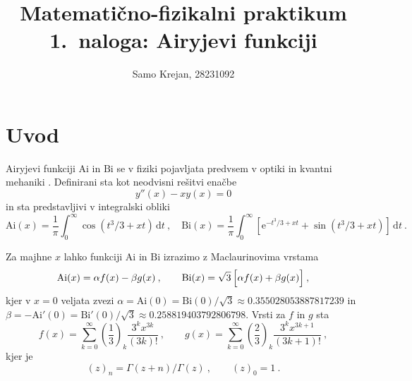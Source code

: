 \documentclass[slovene,11pt,a4paper]{article}
\title{
\sc\large Matematično-fizikalni praktikum \thisyear\\
\bigskip
\bf\Large 1.~naloga: Airyjevi funkciji
}
\author{Samo Krejan, 28231092}
\date{}
\newcommand{\dd}{\,\mathrm{d}}
\newcommand{\Ai}{\mathrm{Ai}}
\newcommand{\Bi}{\mathrm{Bi}}
\begin{document}
\maketitle
\vspace{-1cm}

\section{Uvod}
\label{uvod}

Airyjevi funkciji $\Ai$ in $\Bi$
se v fiziki pojavljata predvsem v optiki in kvantni mehaniki
\cite{Airy_use}.  Definirani sta kot neodvisni rešitvi enačbe
%
\begin{equation*}
  y''(x) -xy(x) = 0
\end{equation*}
%
in sta predstavljivi v integralski obliki
%
\begin{equation*}
  \Ai(x) = \frac{1}{\pi} \int_0^\infty \cos (t^3/3 + x t) \dd t \>,\quad
  \Bi(x) = \frac{1}{\pi} \int_0^\infty \left[ \mathrm{e}^{-t^3/3 + x t}
  + \sin (t^3/3 + x t) \right] \dd t \>.
\end{equation*}
%


Za majhne $x$ lahko funkciji $\Ai$ in $\Bi$ izrazimo
z Maclaurinovima vrstama
%
\begin{equation*}
  \Ai(x) = \alpha f(x) - \beta g(x)\>,\qquad
  \Bi(x) = \sqrt{3}\, \Bigl[\alpha f (x) + \beta g(x) \Bigr]\>,
\end{equation*}
kjer v $x=0$ veljata zvezi
%
$\alpha = \Ai(0) = \Bi(0)/\sqrt{3}\approx 0.355028053887817239$ in
$\beta = -\Ai'(0) = \Bi'(0)/\sqrt{3}\approx 0.258819403792806798$.
Vrsti za $f$ in $g$ sta
\begin{equation*}
  f(x) = \sum_{k=0}^\infty
  \left(\frac{1}{3}\right)_k \frac{3^k x^{3k}}{(3k)!} \>, \qquad
  g(x) = \sum_{k=0}^\infty
  \left(\frac{2}{3}\right)_k \frac{3^k x^{3k+1}}{(3k+1)!} \>,
\end{equation*}
kjer je
\begin{equation*}
  (z)_n = \Gamma(z+n)/\Gamma(z) \>, \qquad (z)_0 = 1 \>.
\end{equation*}
\end{document}
